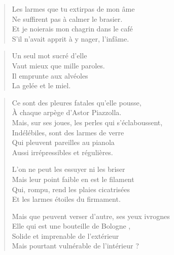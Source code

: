 \begin{verse}\quatrain
  Les larmes que tu extirpas de mon âme\\ 
  Ne suffirent pas à calmer le brasier.\\ 
  Et je noierais mon chagrin dans le café\\ 
  S’il n’avait apprit à y nager, l’infâme. %
\end{verse}

\begin{verse}\quatrain
  Un seul mot sucré d’elle\\ 
  Vaut mieux que mille paroles.\\ 
  Il emprunte aux alvéoles\\ 
  La gelée et le miel. %
\end{verse}

\begin{verse}\quatrain\sizain
  Ce sont des pleures fatales qu’elle pousse,\\ 
  À chaque arpège d’Astor Piazzolla.\\ 
  Mais, sur ses joues, les perles qui s’éclaboussent,\\ 
  Indélébiles, sont des larmes de verre\\ 
  Qui pleuvent pareilles au pianola\\ 
  Aussi irrépressibles et régulières. %

  L’on ne peut les essuyer ni les briser\\ 
  Mais leur point faible en est le filament%
  \\ 
  Qui, rompu, rend les plaies cicatrisées\\ 
  Et les larmes étoiles du firmament. %

  Mais que peuvent verser d’autre, ses yeux ivrognes\\ 
  Elle qui est une bouteille de Bologne%
,\\ 
  Solide et imprenable de l’extérieur\\ 
  Mais pourtant vulnérable de l’intérieur ? %
\end{verse}

